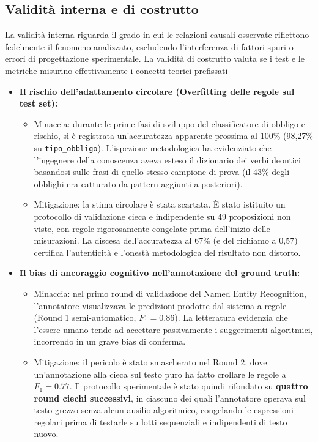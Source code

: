 \documentclass[12pt,a4paper,oneside]{report}
\begin{document}
\subsection{Validità interna e di costrutto}
La validità interna riguarda il grado in cui le relazioni causali osservate riflettono fedelmente il fenomeno analizzato, escludendo l'interferenza di fattori spuri o errori di progettazione sperimentale. La validità di costrutto valuta se i test e le metriche misurino effettivamente i concetti teorici prefissati

\begin{itemize}
    \item \textbf{Il rischio dell'adattamento circolare (Overfitting delle regole sul test set):}
    \begin{itemize}
        \item Minaccia: durante le prime fasi di sviluppo del classificatore di obbligo e rischio, si è registrata un'accuratezza apparente prossima al 100\% (98,27\% su \texttt{tipo\_obbligo}). L'ispezione metodologica ha evidenziato che l'ingegnere della conoscenza aveva esteso il dizionario dei verbi deontici basandosi sulle frasi di quello stesso campione di prova (il 43\% degli obblighi era catturato da pattern aggiunti a posteriori).
        \item Mitigazione: la stima circolare è stata scartata. È stato istituito un protocollo di validazione cieca e indipendente su 49 proposizioni non viste, con regole rigorosamente congelate prima dell'inizio delle misurazioni. La discesa dell'accuratezza al 67\% (e del richiamo a 0,57) certifica l'autenticità e l'onestà metodologica del risultato non distorto.
    \end{itemize}
    \item \textbf{Il bias di ancoraggio cognitivo nell'annotazione del ground truth:}
    \begin{itemize}
        \item Minaccia: nel primo round di validazione del Named Entity Recognition, l'annotatore visualizzava le predizioni prodotte dal sistema a regole (Round 1 semi-automatico, $F_1 = \num{0,86}$). La letteratura evidenzia che l'essere umano tende ad accettare passivamente i suggerimenti algoritmici, incorrendo in un grave bias di conferma.
        \item Mitigazione: il pericolo è stato smascherato nel Round 2, dove un'annotazione alla cieca sul testo puro ha fatto crollare le regole a $F_1 = \num{0,77}$. Il protocollo sperimentale è stato quindi rifondato su \textbf{quattro round ciechi successivi}, in ciascuno dei quali l'annotatore operava sul testo grezzo senza alcun ausilio algoritmico, congelando le espressioni regolari prima di testarle su lotti sequenziali e indipendenti di testo nuovo.
    \end{itemize}


\end{itemize}
\end{document}

